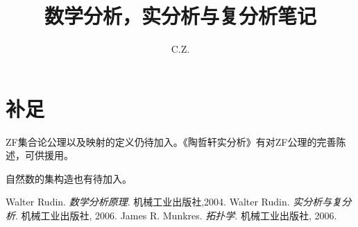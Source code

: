 \documentclass{ctexrep}
\title{数学分析，实分析与复分析笔记}
\author{C.Z.}
\begin{document}
  \maketitle
  \tableofcontents
  \section*{补足}
  ZF集合论公理以及映射的定义仍待加入。《陶哲轩实分析》有对ZF公理的完善陈述，可供援用。
  \par
  自然数的集构造也有待加入。
  \par

  
  
  
  
  
  
  
  
  
  
    

\begin{thebibliography}{9}
Walter Rudin.
\textit{数学分析原理}. 
机械工业出版社,2004.
Walter Rudin.
\textit{实分析与复分析}. 
机械工业出版社, 2006.
James R. Munkres.
\textit{拓扑学}. 
机械工业出版社, 2006.
\end{thebibliography}
  
      
\end{document}
